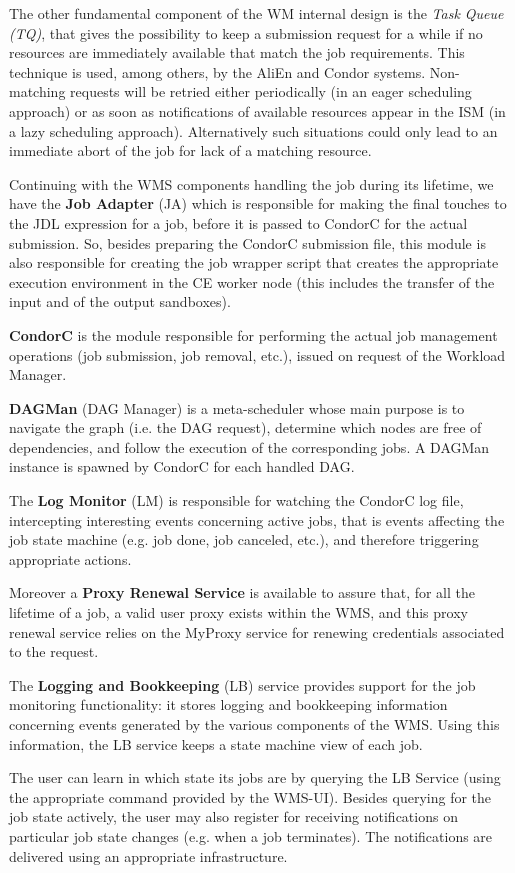 The other fundamental component of the WM internal design is the {\it Task Queue (TQ)}, that gives the possibility 
to keep a submission request for a while if no resources are immediately available that match the job requirements. 
This technique is used, among others, by the AliEn and Condor systems. Non-matching requests will be 
retried either periodically (in an eager scheduling approach) or as soon as notifications of available resources 
appear in the ISM (in a lazy scheduling approach). Alternatively such situations could only lead to an immediate 
abort of the job for lack of a matching resource.
\medskip

Continuing with the WMS components handling the job during its lifetime, we have the {\bf Job Adapter} (JA) which 
is responsible for making the final touches to the JDL expression for a job, before it is passed to CondorC for the 
actual submission. So, besides preparing the CondorC submission file, this module is also responsible for creating 
the job wrapper script that creates the appropriate execution environment in the CE worker node (this includes the 
transfer of the input and of the output sandboxes).
\medskip

{\bf CondorC} is the module responsible for performing the actual job management operations (job submission, 
job removal, etc.), issued on request of the Workload Manager.
\medskip

{\bf DAGMan} (DAG Manager) is a meta-scheduler whose main purpose is to navigate the graph (i.e. the DAG request), 
determine which nodes are free of dependencies, and follow the execution of the corresponding jobs. A DAGMan 
instance is spawned by CondorC for each handled DAG. 

The {\bf Log Monitor} (LM) is responsible for watching the CondorC log file, intercepting interesting events 
concerning active jobs, that is events affecting the job state machine (e.g. job done, job canceled, etc.), and 
therefore triggering appropriate actions.

Moreover a {\bf Proxy Renewal Service} is available to assure that, for all the lifetime of a job, a valid user 
proxy exists within the WMS, and this proxy renewal service relies on the MyProxy service for renewing 
credentials associated to the request.
\medskip

The {\bf Logging and Bookkeeping} (LB) service provides support for the job monitoring functionality: it stores 
logging and bookkeeping information concerning events generated by the various components of the WMS. Using this 
information, the LB service keeps a state machine view of each job.
\medskip

The user can learn in which state its jobs are by querying the LB Service (using the appropriate command provided 
by the WMS-UI). Besides querying for the job state actively, the user may also register for receiving notifications on 
particular job state changes (e.g. when a job terminates). The notifications are delivered using an appropriate 
infrastructure.
